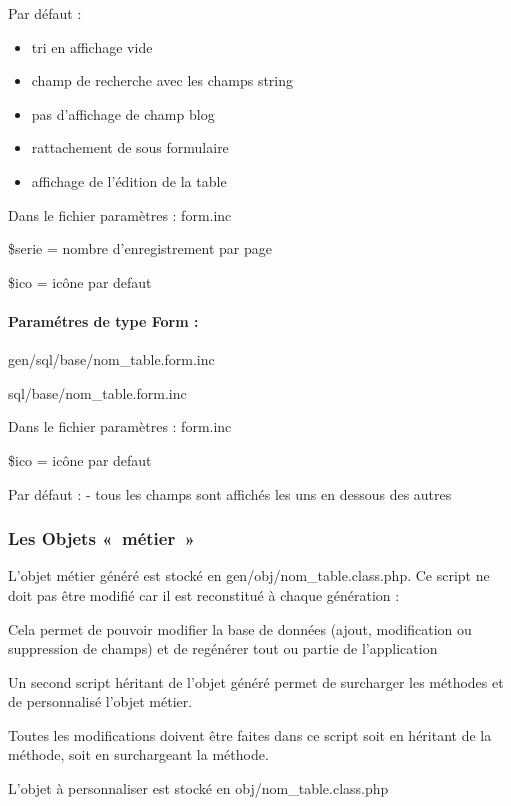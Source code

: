 \documentclass[letterpaper,10pt,french]{manual}
\begin{document}
Par défaut :
\begin{itemize}
\item {} 
tri en affichage vide

\item {} 
champ de recherche avec les champs string

\item {} 
pas d'affichage de champ blog

\item {} 
rattachement de sous formulaire

\item {} 
affichage de l'édition de la table

\end{itemize}

Dans le fichier paramètres : form.inc

\$serie = nombre d'enregistrement par page

\$ico = icône par defaut


\paragraph{Paramétres de type Form :}

gen/sql/base/nom\_table.form.inc

sql/base/nom\_table.form.inc

Dans le fichier paramètres : form.inc

\$ico = icône par defaut

Par défaut :
- tous les champs sont affichés les uns en dessous des autres


\subsubsection{Les Objets « métier »}

L'objet métier généré est stocké en gen/obj/nom\_table.class.php. Ce script ne doit pas être modifié car il est reconstitué à chaque génération :

Cela permet de pouvoir modifier la base de données (ajout, modification ou suppression de champs) et de regénérer tout ou partie de l'application

Un second script héritant de l'objet généré permet de surcharger les méthodes et de personnalisé l'objet métier.

Toutes les modifications doivent être faites dans ce script soit en héritant de la méthode,
soit en surchargeant la méthode.

L'objet à personnaliser est stocké en obj/nom\_table.class.php
\end{document}
